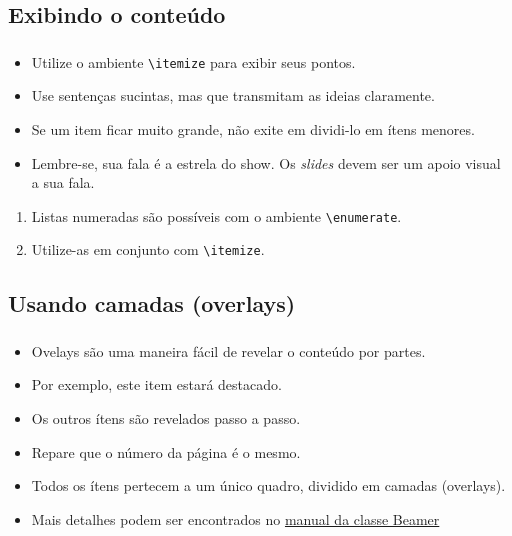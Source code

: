 \documentclass[12pt, xcolor=table, aspectratio=169]{beamer}
\makeatletter
\newcommand*{\currentname}{\@currentlabelname}
\makeatother
\begin{document}
\subsection{Exibindo o conteúdo}
\begin{frame}
\frametitle{\currentname}
  \begin{itemize}
    \item Utilize o ambiente \texttt{{\textbackslash}itemize} para exibir seus pontos.
    \item Use sentenças sucintas, mas que transmitam as ideias claramente.
    \item Se um item ficar muito grande, não exite em dividi-lo em ítens menores.
    \item Lembre-se, sua fala é a estrela do show. Os \textit{slides} devem ser um apoio visual a sua fala.
  \end{itemize}
  \begin{enumerate}
   \item Listas numeradas são possíveis com o ambiente \texttt{{\textbackslash}enumerate}.
   \item Utilize-as em conjunto com \texttt{{\textbackslash}itemize}.
  \end{enumerate}

\end{frame}

\subsection{Usando camadas (overlays)}
\begin{frame}
\frametitle{\currentname}

\begin{itemize}
  \item Ovelays são uma maneira fácil de revelar o conteúdo por partes.
  \item<1-|alert@1> Por exemplo, este item estará destacado. 
  \item<2-> Os outros ítens são revelados passo a passo.
  \item<3-> Repare que o número da página é o mesmo.
  \item<4-> Todos os ítens pertecem a um único quadro, dividido em camadas (overlays).
  \item<5-> Mais detalhes podem ser encontrados no \href{https://tug.ctan.org/macros/latex/contrib/beamer/doc/beameruserguide.pdf}{manual da classe Beamer}
\end{itemize}
\end{frame}
\end{document}
